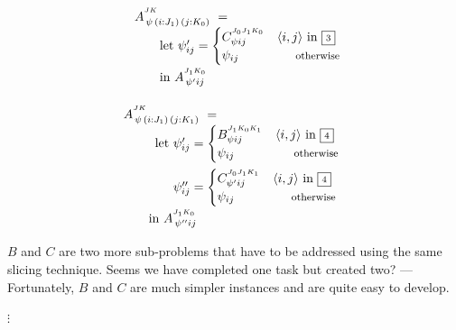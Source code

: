\begin{equation}\LeftEqNo
\renewcommand\arraystretch{1.5}
\begin{array}{l@{}l}
	A^{^{JK}}_{\,\psi\,(i : J_1)\,(j : K_0)} ~=~ \\
	\qquad
	\textrm{let}~\psi'_{ij} = \begin{cases}
	  C^{^{J_0J_1K_0}}_{\psi ij} & \langle i,j\rangle\mbox{ in }\qbox3 \\
	  \psi_{ij} & \otherwise
	\end{cases} \\
	\qquad\textrm{in}~
	A^{^{J_1K_0}}_{\,\psi' ij}
\end{array}
\label{intro:let in A 2 using B}
\end{equation}

\begin{equation}\LeftEqNo
\renewcommand\arraystretch{1.5}
\begin{array}{l@{}l}
	\lspan2{A^{^{JK}}_{\,\psi\,(i : J_1)\,(j : K_1)} ~=~} \\
	\qquad
	\textrm{let}~ & \psi'_{ij} = \begin{cases}
	  B^{^{J_1K_0K_1}}_{\psi ij} & \langle i,j\rangle\mbox{ in }\qbox4 \\
	  \psi_{ij} & \otherwise
	\end{cases} \\[1.2em]
	& \psi''_{ij} = \begin{cases}
	  C^{^{J_0J_1K_1}}_{\psi' ij} & \langle i,j\rangle\mbox{ in }\qbox4 \\
	  \psi_{ij} & \otherwise
	\end{cases} \\
	\lspan2{
	\qquad\textrm{in}~A^{^{J_1K_0}}_{\,\psi'' ij}
	}
\end{array}
\label{intro:let in A 2 using B}
\end{equation}

$B$ and $C$ are two more sub-problems that have to be addressed using the same slicing technique.
Seems we have completed one task but created two? --- Fortunately, $B$ and $C$ are much simpler instances
and are quite easy to develop.


\begin{center}$\vdots$
\end{center}

